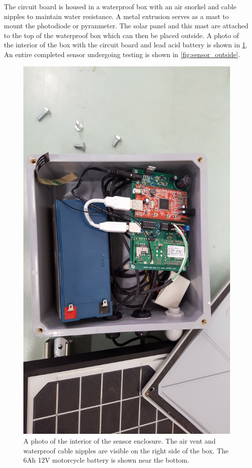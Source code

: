 The circuit board is housed in a waterproof box with an air snorkel
and cable nipples to maintain water resistance.
A metal extrusion serves as a mast to mount the photodiode or
pyranmeter.
The solar panel and this mast are attached to the top of the
waterproof box which can then be placed outside.
A photo of the interior of the box with the circuit board and lead
acid battery is shown in \cref{fig:sensor_int}.
An entire completed sensor undergoing testing is shown in
\cref{fig:sensor_outside}.

\begin{figure}[ht]
  \includegraphics[width=\textwidth]{figs/sensor_interior.jpg}
\caption[Interior of the sensor enclosure]{A photo of the interior of
  the sensor enclosure. The air vent and waterproof cable nipples are
  visible on the right side of the box. The 6Ah 12V motorcycle battery
  is shown near the bottom.}
\label{fig:sensor_int}
\end{figure}

